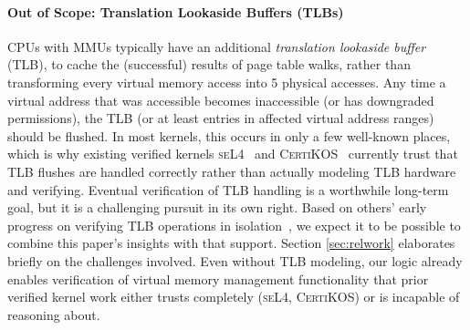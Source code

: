 \paragraph{Out of Scope: Translation Lookaside Buffers (TLBs)}
CPUs with MMUs typically have an additional \emph{translation lookaside buffer}
(TLB), to cache the (successful) results of page table walks, rather than transforming every virtual
memory access into 5 physical accesses. 
Any time a virtual address that was accessible becomes inaccessible (or has downgraded permissions),
the TLB (or at least entries in affected virtual address ranges) should be flushed.
In most kernels, this occurs in only a few well-known places, which is why existing verified kernels
\textsc{seL4}~\cite{Klein2009seL4,seL4TOCS} and \textsc{CertiKOS}~\cite{gu15,gu2016certikos} currently
trust that TLB flushes are handled correctly rather than actually modeling TLB hardware and verifying.
Eventual verification of TLB handling is a worthwhile long-term goal, but it is a challenging pursuit in its
own right. Based on others' early progress on verifying TLB operations in isolation~\cite{syeda2020formal}, we expect
it to be possible to combine this paper's insights with that support. 
Section \ref{sec:relwork} elaborates briefly on the challenges involved.
Even without TLB modeling,
our logic already enables verification of virtual memory management functionality that prior verified kernel work
either trusts completely (\textsc{seL4}, \textsc{CertiKOS}) or is incapable of reasoning about.




